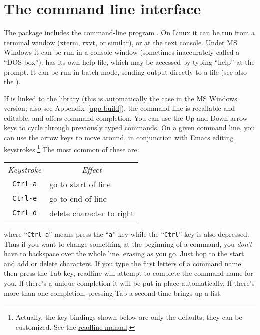 \chapter{The command line interface}
\label{cli}

The  package includes the command-line program
.  On Linux it can be run from a terminal window (xterm,
rxvt, or similar), or at the text console.  Under MS Windows it can be
run in a console window (sometimes inaccurately called a ``DOS box'').
 has its own help file, which may be accessed by typing
``help'' at the prompt. It can be run in batch mode, sending output
directly to a file (see also the \GCR).
    
If  is linked to the  library (this is
automatically the case in the MS Windows version; also see
Appendix~\ref{app-build}), the command line is recallable and
editable, and offers command completion.  You can use the Up and Down
arrow keys to cycle through previously typed commands.  On a given
command line, you can use the arrow keys to move around, in
conjunction with Emacs editing keystrokes.\footnote{Actually, the key
  bindings shown below are only the defaults; they can be customized.
  See the
  \href{http://cnswww.cns.cwru.edu/~chet/readline/readline.html}{readline
    manual}.} The most common of these are:
%    
\begin{center}
  \begin{tabular}{cl}
    \textit{Keystroke} & \multicolumn{1}{c}{\textit{Effect}}\\
    \verb+Ctrl-a+ & go to start of line\\
    \verb+Ctrl-e+ & go to end of line\\
    \verb+Ctrl-d+ & delete character to right\\
  \end{tabular}
\end{center}
%
where ``\verb+Ctrl-a+'' means press the ``\verb+a+'' key while the
``\verb+Ctrl+'' key is also depressed.  Thus if you want to change
something at the beginning of a command, you \emph{don't} have to
backspace over the whole line, erasing as you go.  Just hop to the
start and add or delete characters.  If you type the first letters of
a command name then press the Tab key, readline will attempt to
complete the command name for you.  If there's a unique completion it
will be put in place automatically.  If there's more than one
completion, pressing Tab a second time brings up a list.

